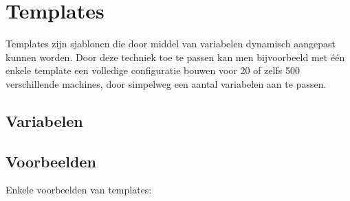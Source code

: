 \chapter{Templates}

Templates zijn sjablonen die door middel van variabelen dynamisch aangepast kunnen worden. Door deze techniek toe te passen kan men bijvoorbeeld met \'{e}én enkele template een volledige configuratie bouwen voor 20 of zelfs 500 verschillende machines, door simpelweg een aantal variabelen aan te passen.

\section{Variabelen}

\section{Voorbeelden}

Enkele voorbeelden van templates:\\


